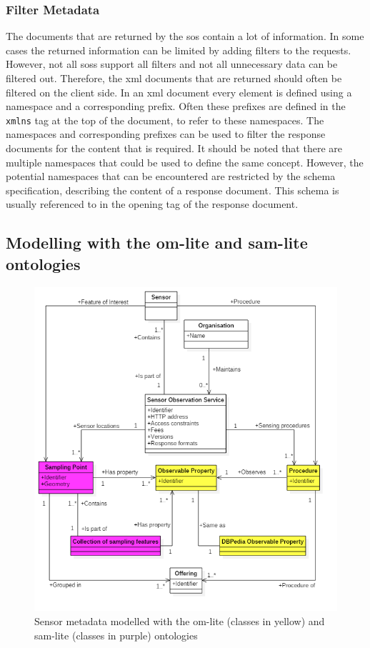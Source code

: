 \subsubsection{Filter Metadata}

The documents that are returned by the \ac{sos} contain a lot of information. In some cases the returned information can be limited by adding filters to the requests. However, not all \aclp{sos} support all filters and not all unnecessary data can be filtered out. Therefore, the \ac{xml} documents that are returned should often be filtered on the client side. In an \ac{xml} document every element is defined using a namespace and a corresponding prefix. Often these prefixes are defined in the \texttt{xmlns} tag at the top of the document, to refer to these namespaces. The namespaces and corresponding prefixes can be used to filter the response documents for the content that is required. It should be noted that there are multiple namespaces that could be used to define the same concept. However, the potential namespaces that can be encountered are restricted by the schema specification, describing the content of a response document. This schema is usually referenced to in the opening tag of the response document.


\subsection{Modelling with the om-lite and sam-lite ontologies}
\begin{figure}
	\centering
	\includegraphics[width=1\linewidth]{UML/SOS_Semantic_UML_2.PNG}
	\caption{Sensor metadata modelled with the om-lite (classes in yellow) and sam-lite (classes in purple) ontologies}
	\label{fig:SOS_Semantic_UML}
\end{figure}

